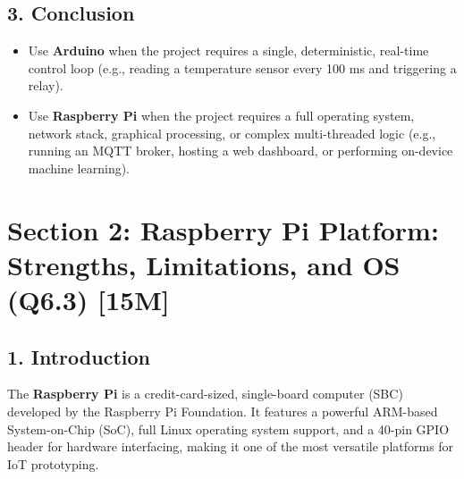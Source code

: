 \subsection{3. Conclusion}
\begin{itemize}
  \item   Use \textbf{Arduino} when the project requires a single, deterministic, real-time control loop (e.g., reading a temperature sensor every 100 ms and triggering a relay).
  \item   Use \textbf{Raspberry Pi} when the project requires a full operating system, network stack, graphical processing, or complex multi-threaded logic (e.g., running an MQTT broker, hosting a web dashboard, or performing on-device machine learning).
\end{itemize}


\section{Section 2: Raspberry Pi Platform: Strengths, Limitations, and OS (Q6.3) [15M]}

\subsection{1. Introduction}
The \textbf{Raspberry Pi} is a credit-card-sized, single-board computer (SBC) developed by the Raspberry Pi Foundation. It features a powerful ARM-based System-on-Chip (SoC), full Linux operating system support, and a 40-pin GPIO header for hardware interfacing, making it one of the most versatile platforms for IoT prototyping.


